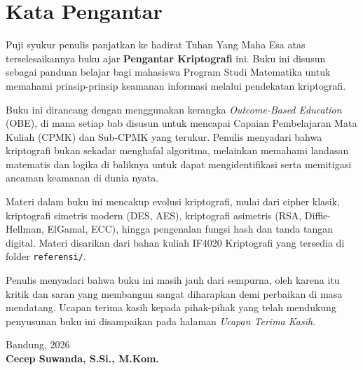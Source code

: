 \documentclass[../main.tex]{subfiles}
\begin{document}
\chapter*{Kata Pengantar}

Puji syukur penulis panjatkan ke hadirat Tuhan Yang Maha Esa atas terselesaikannya buku ajar \textbf{Pengantar Kriptografi} ini. Buku ini disusun sebagai panduan belajar bagi mahasiswa Program Studi Matematika untuk memahami prinsip-prinsip keamanan informasi melalui pendekatan kriptografi.

Buku ini dirancang dengan menggunakan kerangka \textit{Outcome-Based Education} (OBE), di mana setiap bab disusun untuk mencapai Capaian Pembelajaran Mata Kuliah (CPMK) dan Sub-CPMK yang terukur. Penulis menyadari bahwa kriptografi bukan sekadar menghafal algoritma, melainkan memahami landasan matematis dan logika di baliknya untuk dapat mengidentifikasi serta memitigasi ancaman keamanan di dunia nyata.

Materi dalam buku ini mencakup evolusi kriptografi, mulai dari cipher klasik, kriptografi simetris modern (DES, AES), kriptografi asimetris (RSA, Diffie-Hellman, ElGamal, ECC), hingga pengenalan fungsi hash dan tanda tangan digital. Materi disarikan dari bahan kuliah IF4020 Kriptografi \citep{munir2026} yang tersedia di folder \texttt{referensi/}.

Penulis menyadari bahwa buku ini masih jauh dari sempurna, oleh karena itu kritik dan saran yang membangun sangat diharapkan demi perbaikan di masa mendatang. Ucapan terima kasih kepada pihak-pihak yang telah mendukung penyusunan buku ini disampaikan pada halaman \emph{Ucapan Terima Kasih}.

\vspace{2cm}

\begin{flushright}
Bandung, 2026\\
\vspace{1cm}
\textbf{Cecep Suwanda, S.Si., M.Kom.}
\end{flushright}
\end{document}

